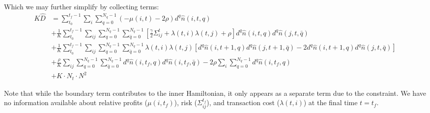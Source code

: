 \documentclass[12pt]{article}
\begin{document}
Which we may further simplify by collecting terms:
\begin{align}
K\hat{D} &= \sum_{t_0}^{t_f-1} \sum_i \sum_{q=0}^{N_q-1} (-\mu(i,t) - 2\rho) d^q \hat{n}(i,t,q) \nonumber\\
&+ \frac{1}{K} \sum_{t_0}^{t_f-1} \sum_{ij} \sum_{q=0}^{N_q-1}\sum_{\bar{q}=0}^{N_q-1} \left[ \frac{\gamma}{2}{\Sigma^t_{ij}} + \lambda(t,i)\lambda(t,j) + \rho \right] d^q \hat{n}(i,t,q) d^q \hat{n}(j,t,\bar{q}) \nonumber\\
&+ \frac{1}{K} \sum_{t_0}^{t_f-1} \sum_{ij} \sum_{q=0}^{N_q-1}\sum_{\bar{q}=0}^{N_q-1} \lambda(t,i)\lambda(t,j) \left[ d^q \hat{n}(i,t+1,q) d^q \hat{n}(j,t+1,\bar{q}) - 2 d^q \hat{n}(i,t+1,q) d^q \hat{n}(j,t,\bar{q}) \right] \nonumber\\    
&+\frac{\rho}{K}  \sum_{ij} \sum_{q=0}^{N_q-1}\sum_{\bar{q}=0}^{N_q-1} d^q \hat{n}(i,t_f,q) d^q \hat{n}(i,t_f,\bar{q}) - 2\rho \sum_i \sum_{q=0}^{N_q-1} d^q \hat{n}(i,t_f,q) \nonumber\\
&+ K\cdot N_t\cdot N^2 
\end{align}

Note that while the boundary term contributes to the inner Hamiltonian, it only appears as a separate term due to the constraint. We have no information available about relative profits ($\mu(i,t_f)$), risk ($\Sigma^{t_f}_{ij}$), and transaction cost ($\lambda(t,i)$) at the final time $t = t_f$.

\begin{thebibliography}{10}
\end{thebibliography}
\end{document}
